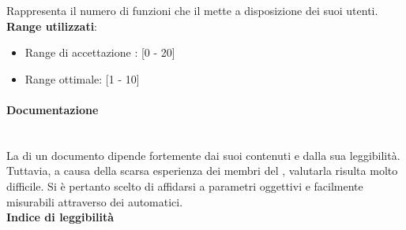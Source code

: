 Rappresenta il numero di funzioni che il  mette a disposizione dei suoi utenti. \\

\textbf{Range utilizzati}:
\begin{itemize}
	\item Range di accettazione : [0 - 20]
	\item Range ottimale: [1 - 10]
\end{itemize}

\paragraph*{Documentazione}\mbox{}\\
\hypertarget{metriche_documenti}{}
La  di un documento dipende fortemente dai suoi contenuti e dalla sua leggibilità. Tuttavia, a causa della scarsa esperienza dei membri del , valutarla risulta molto difficile. Si è pertanto scelto di affidarsi a parametri oggettivi e facilmente misurabili attraverso dei  automatici.\\

\textbf{Indice di leggibilità}\\

